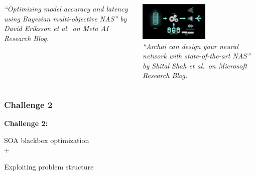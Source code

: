 \documentclass[aspectratio=169]{beamer}
\begin{document}
\begin{frame}
\begin{columns}
\begin{column}{0.33\textwidth}
\begin{center}
{\tiny \sl
``Optimizing model accuracy and latency using Bayesian multi-objective NAS''
by David Eriksson et al.\ on Meta AI Research Blog.\\
}
\end{center}
\end{column}
\begin{column}{0.33\textwidth}
\begin{center}
\includegraphics[height=5em]{../img/probs/microsoft-nas.png}\\
{\tiny \sl
``Archai can design your neural network with state-of-the-art NAS''
by Shital Shah et al.\ on Microsoft Research Blog.\\
}
\end{center}
\end{column}
\end{columns}
\end{frame}

%
%
%
%
%
%
%
%
%
%
%
%
%
%
%
%

\begin{frame}\frametitle{Challenge 2}
\vfill
\begin{center}
{\Huge \bf
Challenge 2:\\

\bigskip

SOA blackbox optimization\\
+\\
\medskip

Exploiting problem structure
}
\end{center}
\vfill
\end{frame}
\end{document}
